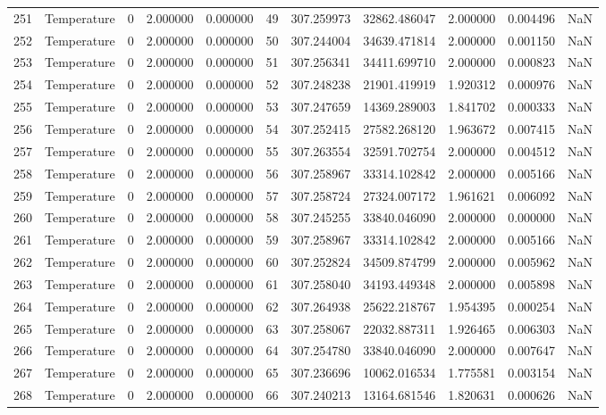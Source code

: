 \begin{tabular}{llrrrrrrrrr}
251 & Temperature & 0 & 2.000000 & 0.000000 & 49 & 307.259973 & 32862.486047 & 2.000000 & 0.004496 & NaN \\
252 & Temperature & 0 & 2.000000 & 0.000000 & 50 & 307.244004 & 34639.471814 & 2.000000 & 0.001150 & NaN \\
253 & Temperature & 0 & 2.000000 & 0.000000 & 51 & 307.256341 & 34411.699710 & 2.000000 & 0.000823 & NaN \\
254 & Temperature & 0 & 2.000000 & 0.000000 & 52 & 307.248238 & 21901.419919 & 1.920312 & 0.000976 & NaN \\
255 & Temperature & 0 & 2.000000 & 0.000000 & 53 & 307.247659 & 14369.289003 & 1.841702 & 0.000333 & NaN \\
256 & Temperature & 0 & 2.000000 & 0.000000 & 54 & 307.252415 & 27582.268120 & 1.963672 & 0.007415 & NaN \\
257 & Temperature & 0 & 2.000000 & 0.000000 & 55 & 307.263554 & 32591.702754 & 2.000000 & 0.004512 & NaN \\
258 & Temperature & 0 & 2.000000 & 0.000000 & 56 & 307.258967 & 33314.102842 & 2.000000 & 0.005166 & NaN \\
259 & Temperature & 0 & 2.000000 & 0.000000 & 57 & 307.258724 & 27324.007172 & 1.961621 & 0.006092 & NaN \\
260 & Temperature & 0 & 2.000000 & 0.000000 & 58 & 307.245255 & 33840.046090 & 2.000000 & 0.000000 & NaN \\
261 & Temperature & 0 & 2.000000 & 0.000000 & 59 & 307.258967 & 33314.102842 & 2.000000 & 0.005166 & NaN \\
262 & Temperature & 0 & 2.000000 & 0.000000 & 60 & 307.252824 & 34509.874799 & 2.000000 & 0.005962 & NaN \\
263 & Temperature & 0 & 2.000000 & 0.000000 & 61 & 307.258040 & 34193.449348 & 2.000000 & 0.005898 & NaN \\
264 & Temperature & 0 & 2.000000 & 0.000000 & 62 & 307.264938 & 25622.218767 & 1.954395 & 0.000254 & NaN \\
265 & Temperature & 0 & 2.000000 & 0.000000 & 63 & 307.258067 & 22032.887311 & 1.926465 & 0.006303 & NaN \\
266 & Temperature & 0 & 2.000000 & 0.000000 & 64 & 307.254780 & 33840.046090 & 2.000000 & 0.007647 & NaN \\
267 & Temperature & 0 & 2.000000 & 0.000000 & 65 & 307.236696 & 10062.016534 & 1.775581 & 0.003154 & NaN \\
268 & Temperature & 0 & 2.000000 & 0.000000 & 66 & 307.240213 & 13164.681546 & 1.820631 & 0.000626 & NaN \\

\end{tabular}
